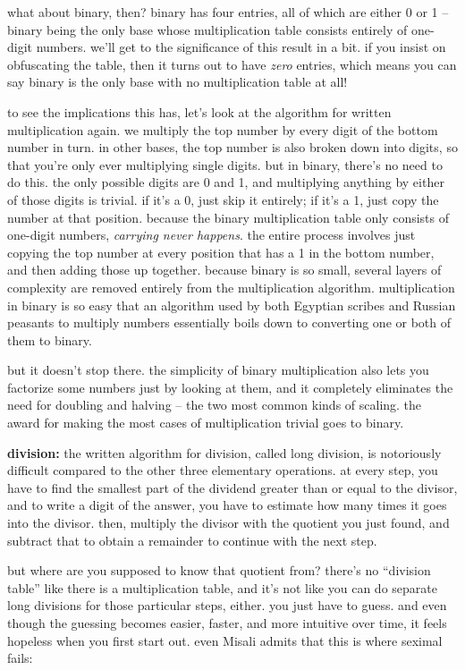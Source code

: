 \documentclass[../best.tex]{subfiles}
\begin{document}
what about binary, then? binary has four entries, all of which are either 0 or 1 -- binary being the only base whose multiplication table consists entirely of one-digit numbers.\myfootnote{} we'll get to the significance of this result in a bit. if you insist on obfuscating the table, then it turns out to have \emph{zero} entries, which means you can say binary is the only base with no multiplication table at all!

to see the implications this has, let's look at the algorithm for written multiplication again. we multiply the top number by every digit of the bottom number in turn. in other bases, the top number is also broken down into digits, so that you're only ever multiplying single digits. but in binary, there's no need to do this. the only possible digits are 0 and 1, and multiplying anything by either of those digits is trivial. if it's a 0, just skip it entirely; if it's a 1, just copy the number at that position. because the binary multiplication table only consists of one-digit numbers, \emph{carrying never happens}. the entire process involves just copying the top number at every position that has a 1 in the bottom number, and then adding those up together. because binary is so small, several layers of complexity are removed entirely from the multiplication algorithm. multiplication in binary is so easy that an algorithm used by both Egyptian scribes and Russian peasants to multiply numbers essentially boils down to converting one or both of them to binary.\myfootnote{}

but it doesn't stop there. the simplicity of binary multiplication also lets you factorize some numbers just by looking at them,\myfootnote{} and it completely eliminates the need for doubling and halving -- the two most common kinds of scaling. the award for making the most cases of multiplication trivial goes to binary.\myfootnote{}

{\bf division:} the written algorithm for division, called long division, is notoriously difficult compared to the other three elementary operations. at every step, you have to find the smallest part of the dividend greater than or equal to the divisor, and to write a digit of the answer, you have to estimate how many times it goes into the divisor. then, multiply the divisor with the quotient you just found, and subtract that to obtain a remainder to continue with the next step.

but where are you supposed to know that quotient from? there's no ``division table'' like there is a multiplication table, and it's not like you can do separate long divisions for those particular steps, either. you just have to guess. and even though the guessing becomes easier, faster, and more intuitive over time, it feels hopeless when you first start out. even Misali admits that this is where seximal fails:\myfootnote{}
\end{document}

